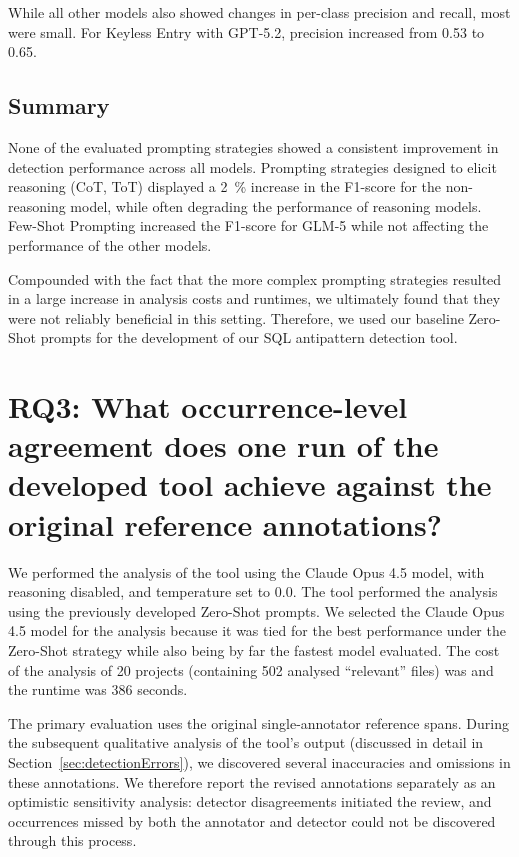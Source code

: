 While all other models also showed changes in per-class precision and recall, most were small. For Keyless Entry with GPT-5.2, precision increased from \num{0.53} to \num{0.65}.

\subsection{Summary}

None of the evaluated prompting strategies showed a consistent improvement in detection performance across all models. Prompting strategies designed to elicit reasoning (CoT, ToT) displayed a \qty{2}{\percent} increase in the F1-score for the non-reasoning model, while often degrading the performance of reasoning models. Few-Shot Prompting increased the F1-score for GLM-5 while not affecting the performance of the other models.

Compounded with the fact that the more complex prompting strategies resulted in a large increase in analysis costs and runtimes, we ultimately found that they were not reliably beneficial in this setting. Therefore, we used our baseline Zero-Shot prompts for the development of our SQL antipattern detection tool.

\section{RQ3: What occurrence-level agreement does one run of the developed tool achieve against the original reference annotations?}\label{sec:resultsRQ3}

We performed the analysis of the tool using the Claude Opus 4.5 model, with reasoning disabled, and temperature set to \num{0.0}. The tool performed the analysis using the previously developed Zero-Shot prompts. We selected the Claude Opus 4.5 model for the analysis because it was tied for the best performance under the Zero-Shot strategy while also being by far the fastest model evaluated. The cost of the analysis of \num{20} projects (containing \num{502} analysed “relevant” files) was  and the runtime was \num{386} seconds.

The primary evaluation uses the original single-annotator reference spans. During the subsequent qualitative analysis of the tool's output (discussed in detail in Section~\ref{sec:detectionErrors}), we discovered several inaccuracies and omissions in these annotations. We therefore report the revised annotations separately as an optimistic sensitivity analysis: detector disagreements initiated the review, and occurrences missed by both the annotator and detector could not be discovered through this process.


